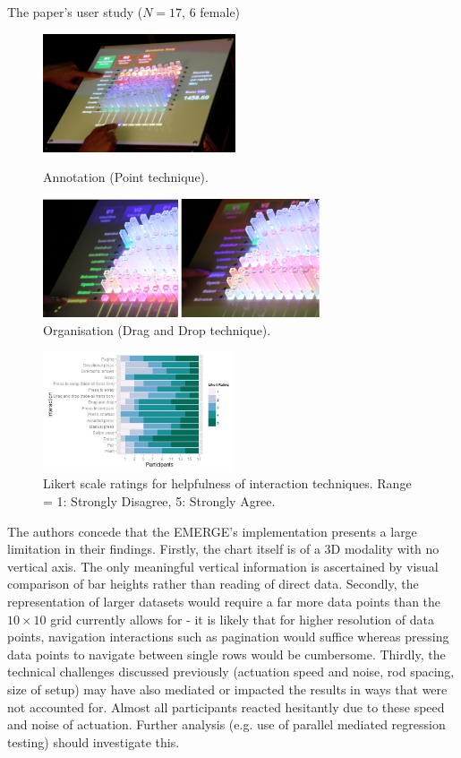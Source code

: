 \documentclass[11pt]{article}
\begin{document}
The paper's user study ($N=17$, 6 female) 

\begin{figure}[H]
\centering
  \includegraphics[height=3.5cm]{img/taher2015-annotation.png}
  \caption{Annotation (Point technique).}\label{fig:taher2015-annotation}
\endminipage\hfill
{}%
\centering
  \includegraphics[height=3.5cm]{img/taher2015-organize.png}
  \caption{Organisation (Drag and Drop technique).}\label{fig:taher2015-organize}
\endminipage
\end{figure}

\begin{figure}[H]
\centering
\includegraphics[width=0.5\textwidth]{img/taher2015-likert.png} 
\caption{Likert scale ratings for helpfulness of interaction
techniques. Range = 1: Strongly Disagree, 5: Strongly Agree.}\label{fig:taher2015-likert}
\end{figure}

The authors concede that the EMERGE's implementation presents a large limitation in their findings. Firstly, the chart itself is of a 3D modality with no vertical axis. The only meaningful vertical information is ascertained by visual comparison of bar heights rather than reading of direct data. Secondly, the representation of larger datasets would require a far more data points than the $10\times10$ grid currently allows for - it is likely that for higher resolution of data points, navigation interactions such as pagination would suffice whereas pressing data points to navigate between single rows would be cumbersome. Thirdly, the technical challenges discussed previously (actuation speed and noise, rod spacing, size of setup) may have also mediated or impacted the results in ways that were not accounted for. Almost all participants reacted hesitantly due to these speed and noise of actuation. Further analysis (e.g. use of parallel mediated regression testing) should investigate this.
\end{document}
